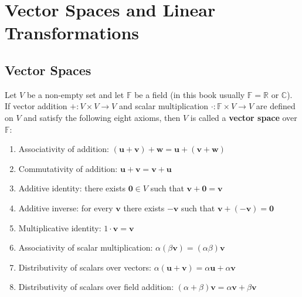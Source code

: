 \section{\texorpdfstring{Vector Spaces and Linear Transformations}{Vector Spaces and Linear Transformations}}

\subsection{\texorpdfstring{Vector Spaces}{Vector Spaces}}

\begin{definition}\label{def:vector_space}
Let $V$ be a non-empty set and let $\mathbb{F}$ be a field (in this book usually $\mathbb{F} = \mathbb{R}$ or $\mathbb{C}$). If vector addition $+: V \times V \to V$ and scalar multiplication $\cdot: \mathbb{F} \times V \to V$ are defined on $V$ and satisfy the following eight axioms, then $V$ is called a \textbf{vector space} over $\mathbb{F}$:
\begin{enumerate}[label=(\roman*)]
    \item Associativity of addition: $(\mathbf{u} + \mathbf{v}) + \mathbf{w} = \mathbf{u} + (\mathbf{v} + \mathbf{w})$
    \item Commutativity of addition: $\mathbf{u} + \mathbf{v} = \mathbf{v} + \mathbf{u}$
    \item Additive identity: there exists $\mathbf{0} \in V$ such that $\mathbf{v} + \mathbf{0} = \mathbf{v}$
    \item Additive inverse: for every $\mathbf{v}$ there exists $-\mathbf{v}$ such that $\mathbf{v} + (-\mathbf{v}) = \mathbf{0}$
    \item Multiplicative identity: $1 \cdot \mathbf{v} = \mathbf{v}$
    \item Associativity of scalar multiplication: $\alpha(\beta\mathbf{v}) = (\alpha\beta)\mathbf{v}$
    \item Distributivity of scalars over vectors: $\alpha(\mathbf{u} + \mathbf{v}) = \alpha\mathbf{u} + \alpha\mathbf{v}$
    \item Distributivity of scalars over field addition: $(\alpha + \beta)\mathbf{v} = \alpha\mathbf{v} + \beta\mathbf{v}$
\end{enumerate}
\end{definition}

